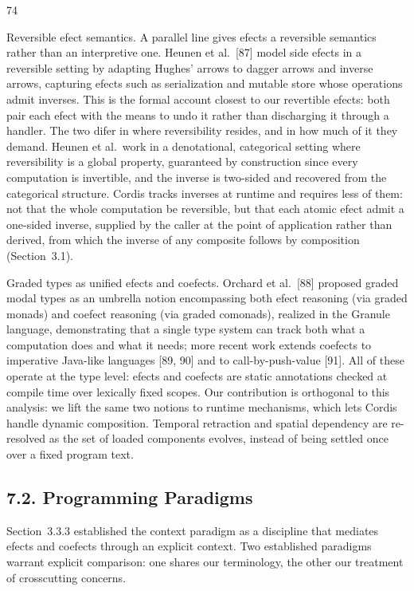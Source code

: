 \documentclass[
  10
]{article}
\begin{document}
74

Reversible efect semantics. A parallel line gives efects a reversible
semantics rather than an interpretive one. Heunen et al.~{[}87{]} model
side efects in a reversible setting by adapting Hughes' arrows to dagger
arrows and inverse arrows, capturing efects such as serialization and
mutable store whose operations admit inverses. This is the formal
account closest to our revertible efects: both pair each efect with the
means to undo it rather than discharging it through a handler. The two
difer in where reversibility resides, and in how much of it they demand.
Heunen et al.~work in a denotational, categorical setting where
reversibility is a global property, guaranteed by construction since
every computation is invertible, and the inverse is two-sided and
recovered from the categorical structure. Cordis tracks inverses at
runtime and requires less of them: not that the whole computation be
reversible, but that each atomic efect admit a one-sided inverse,
supplied by the caller at the point of application rather than derived,
from which the inverse of any composite follows by composition
(Section~3.1).

Graded types as unified efects and coefects. Orchard et al.~{[}88{]}
proposed graded modal types as an umbrella notion encompassing both
efect reasoning (via graded monads) and coefect reasoning (via graded
comonads), realized in the Granule language, demonstrating that a single
type system can track both what a computation does and what it needs;
more recent work extends coefects to imperative Java-like languages
{[}89, 90{]} and to call-by-push-value {[}91{]}. All of these operate at
the type level: efects and coefects are static annotations checked at
compile time over lexically fixed scopes. Our contribution is orthogonal
to this analysis: we lift the same two notions to runtime mechanisms,
which lets Cordis handle dynamic composition. Temporal retraction and
spatial dependency are re-resolved as the set of loaded components
evolves, instead of being settled once over a fixed program text.

\subsection{7.2. Programming Paradigms}\label{programming-paradigms}

Section~3.3.3 established the context paradigm as a discipline that
mediates efects and coefects through an explicit context. Two
established paradigms warrant explicit comparison: one shares our
terminology, the other our treatment of crosscutting concerns.
\end{document}

